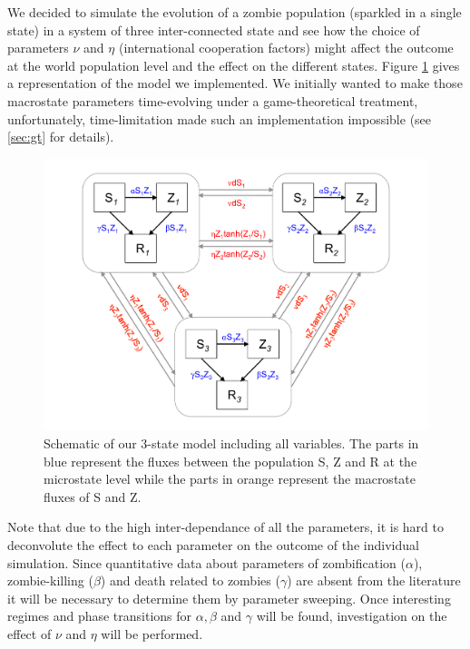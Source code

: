 \documentclass[11pt]{article} %
\begin{document}
We decided to simulate the evolution of a zombie population (sparkled in a single state) in a system of three inter-connected state and see how the choice of parameters $\nu$ and $\eta$ (international cooperation factors) might affect the outcome at the world population level and the effect on the different states. Figure \ref{totalmodel} gives a representation of the model we implemented. We initially wanted to make those macrostate parameters time-evolving under a game-theoretical treatment, unfortunately, time-limitation made such an implementation impossible (see \ref{sec:gt} for details). 
\begin{figure}[h!]
\centerline{
\includegraphics[scale=0.45]{../images/Powerpoint_figures/total_model.pdf}}
\caption{Schematic of our 3-state model including all variables. The parts in blue represent the fluxes between the population S, Z and R at the microstate level while the parts in orange represent the macrostate fluxes of S and Z.\label{totalmodel} }
\end{figure}


Note that due to the high inter-dependance of all the parameters, it is hard to deconvolute the effect to each parameter on the outcome of the individual simulation. Since quantitative data about parameters of zombification ($\alpha$), zombie-killing ($\beta$) and death related to zombies ($\gamma$) are absent from the literature it will be necessary to determine them by parameter sweeping. Once interesting regimes and phase transitions for $\alpha, \beta$ and $\gamma$ will be found, investigation on the effect of $\nu$ and $\eta$ will be performed.


\newpage
\end{document}
